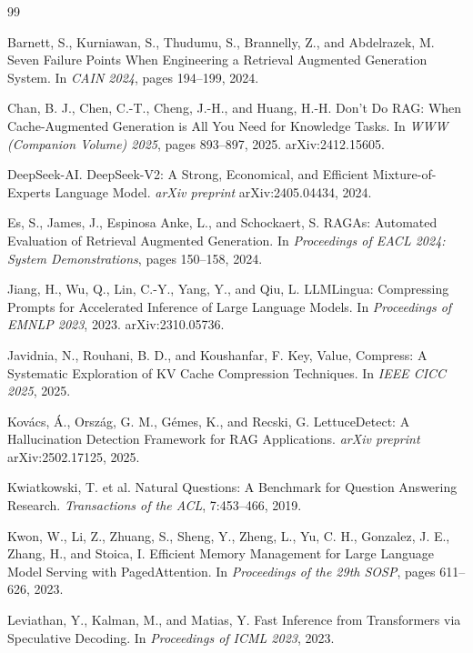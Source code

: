 \documentclass[12pt,a4paper]{article}
\begin{document}
\begin{thebibliography}{99}

Barnett, S., Kurniawan, S., Thudumu, S., Brannelly, Z., and Abdelrazek, M. Seven Failure Points When Engineering a Retrieval Augmented Generation System. In \textit{CAIN 2024}, pages 194--199, 2024.

Chan, B. J., Chen, C.-T., Cheng, J.-H., and Huang, H.-H. Don't Do RAG: When Cache-Augmented Generation is All You Need for Knowledge Tasks. In \textit{WWW (Companion Volume) 2025}, pages 893--897, 2025. arXiv:2412.15605.

DeepSeek-AI. DeepSeek-V2: A Strong, Economical, and Efficient Mixture-of-Experts Language Model. \textit{arXiv preprint} arXiv:2405.04434, 2024.

Es, S., James, J., Espinosa Anke, L., and Schockaert, S. RAGAs: Automated Evaluation of Retrieval Augmented Generation. In \textit{Proceedings of EACL 2024: System Demonstrations}, pages 150--158, 2024.

Jiang, H., Wu, Q., Lin, C.-Y., Yang, Y., and Qiu, L. LLMLingua: Compressing Prompts for Accelerated Inference of Large Language Models. In \textit{Proceedings of EMNLP 2023}, 2023. arXiv:2310.05736.

Javidnia, N., Rouhani, B. D., and Koushanfar, F. Key, Value, Compress: A Systematic Exploration of KV Cache Compression Techniques. In \textit{IEEE CICC 2025}, 2025.

Kovács, Á., Ország, G. M., Gémes, K., and Recski, G. LettuceDetect: A Hallucination Detection Framework for RAG Applications. \textit{arXiv preprint} arXiv:2502.17125, 2025.

Kwiatkowski, T. et al. Natural Questions: A Benchmark for Question Answering Research. \textit{Transactions of the ACL}, 7:453--466, 2019.

Kwon, W., Li, Z., Zhuang, S., Sheng, Y., Zheng, L., Yu, C. H., Gonzalez, J. E., Zhang, H., and Stoica, I. Efficient Memory Management for Large Language Model Serving with PagedAttention. In \textit{Proceedings of the 29th SOSP}, pages 611--626, 2023.

Leviathan, Y., Kalman, M., and Matias, Y. Fast Inference from Transformers via Speculative Decoding. In \textit{Proceedings of ICML 2023}, 2023.


\end{thebibliography}
\end{document}

